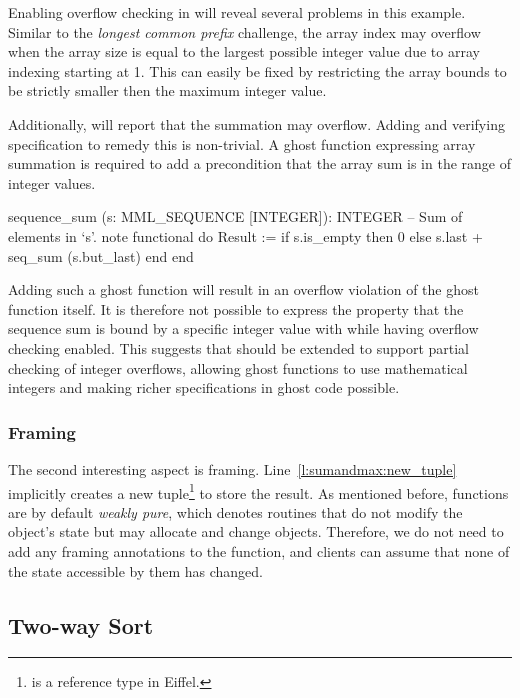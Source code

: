 Enabling overflow checking in \AutoProof will reveal several problems in this example.
Similar to the \emph{longest common prefix} challenge, the array index  may overflow when the array size is equal to the largest possible integer value due to array indexing starting at 1. This can easily be fixed by restricting the array bounds to be strictly smaller then the maximum integer value.

Additionally, \AutoProof will report that the summation may overflow.
Adding and verifying specification to remedy this is non-trivial.
A ghost function expressing array summation is required to add a precondition that the array sum is in the range of integer values.
\begin{erunning}
sequence_sum (s: MML_SEQUENCE [INTEGER]): INTEGER
		-- Sum of elements in `s'.
	note functional
	do
		Result := if s.is_empty then 0 
		          else s.last + seq_sum (s.but_last) end
	end
\end{erunning}
Adding such a ghost function will result in an overflow violation of the ghost function itself.
It is therefore not possible to express the property that the sequence sum is bound by a specific integer value with \AutoProof while having overflow checking enabled.
This suggests that \AutoProof should be extended to support partial checking of integer overflows, allowing ghost functions to use mathematical integers and making richer specifications in ghost code possible.


\subsubsection{Framing}

The second interesting aspect is framing. 
Line~\ref{l:sumandmax:new_tuple} implicitly creates a new tuple\footnote{ is a reference type in Eiffel.} to store the result.
As mentioned before, functions are by default \emph{weakly pure}, which denotes routines that do not modify the object's state but may allocate and change  objects.
Therefore, we do not need to add any framing annotations to the function, and clients can assume that none of the state accessible by them has changed.


\subsection{Two-way Sort}

